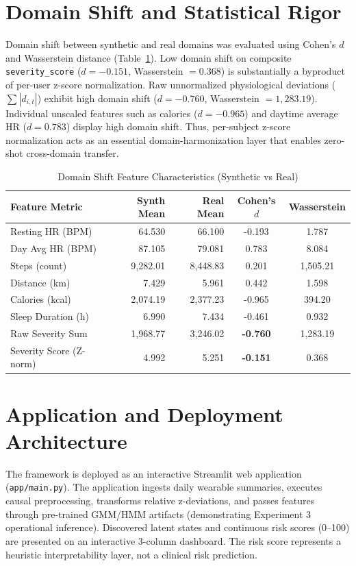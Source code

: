 \documentclass[conference]{IEEEtran}
\begin{document}
\section{Domain Shift and Statistical Rigor}
Domain shift between synthetic and real domains was evaluated using Cohen's $d$ and Wasserstein distance (Table~\ref{tab:domain_shift}). Low domain shift on composite \texttt{severity\_score} ($d = -0.151$, Wasserstein $= 0.368$) is substantially a byproduct of per-user z-score normalization. Raw unnormalized physiological deviations ($\sum |d_{i,t}|$) exhibit high domain shift ($d = -0.760$, Wasserstein $= 1,283.19$). Individual unscaled features such as calories ($d = -0.965$) and daytime average HR ($d = 0.783$) display high domain shift. Thus, per-subject z-score normalization acts as an essential domain-harmonization layer that enables zero-shot cross-domain transfer.

\begin{table}[t]
\caption{Domain Shift Feature Characteristics (Synthetic vs Real)}
\label{tab:domain_shift}
\centering
\begin{tabular}{lrrcc}
\toprule
\textbf{Feature Metric} & \textbf{Synth Mean} & \textbf{Real Mean} & \textbf{Cohen's $d$} & \textbf{Wasserstein} \\
\midrule
Resting HR (BPM) & 64.530 & 66.100 & -0.193 & 1.787 \\
Day Avg HR (BPM) & 87.105 & 79.081 & 0.783 & 8.084 \\
Steps (count) & 9,282.01 & 8,448.83 & 0.201 & 1,505.21 \\
Distance (km) & 7.429 & 5.961 & 0.442 & 1.598 \\
Calories (kcal) & 2,074.19 & 2,377.23 & -0.965 & 394.20 \\
Sleep Duration (h) & 6.990 & 7.434 & -0.461 & 0.932 \\
\midrule
Raw Severity Sum & 1,968.77 & 3,246.02 & \textbf{-0.760} & 1,283.19 \\
Severity Score (Z-norm) & 4.992 & 5.251 & \textbf{-0.151} & 0.368 \\
\bottomrule
\end{tabular}
\end{table}

\section{Application and Deployment Architecture}
The framework is deployed as an interactive Streamlit web application (\texttt{app/main.py}). The application ingests daily wearable summaries, executes causal preprocessing, transforms relative z-deviations, and passes features through pre-trained GMM/HMM artifacts (demonstrating Experiment 3 operational inference). Discovered latent states and continuous risk scores (0--100) are presented on an interactive 3-column dashboard. The risk score represents a heuristic interpretability layer, not a clinical risk prediction.
\end{document}
